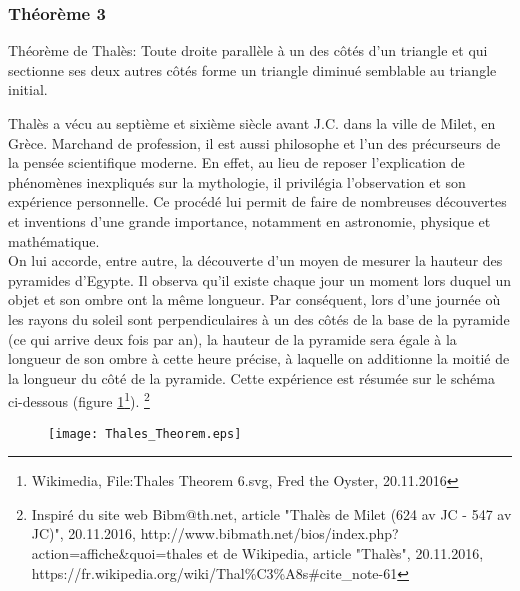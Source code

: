 \documentclass[a4paper,12pt]{article}
\begin{document}
\pagebreak
\subsubsection{Théorème 3}
\begin{theorem}
Théorème de Thalès: Toute droite parallèle à un des côtés d'un triangle et qui sectionne ses deux autres côtés forme un triangle diminué semblable au triangle initial.
\end{theorem}
\begin{remark}
Thalès a vécu au septième et sixième siècle avant J.C. dans la ville de Milet, en Grèce. Marchand de profession, il est aussi philosophe et l'un des précurseurs de la pensée scientifique moderne. En effet, au lieu de reposer l'explication de phénomènes inexpliqués sur la mythologie, il privilégia l'observation et son expérience personnelle. Ce procédé lui permit de faire de nombreuses découvertes et inventions d'une grande importance, notamment en astronomie, physique et mathématique.\\

On lui accorde, entre autre, la découverte d'un moyen de mesurer la hauteur des pyramides d'Egypte. Il observa qu'il existe chaque jour un moment lors duquel un objet et son ombre ont la même longueur. Par conséquent, lors d'une journée où les rayons du soleil sont perpendiculaires à un des côtés de la base de la pyramide (ce qui arrive deux fois par an), la hauteur de la pyramide sera égale à la longueur de son ombre à cette heure précise, à laquelle on additionne la moitié de la longueur du côté de la pyramide. Cette expérience est résumée sur le schéma ci-dessous (figure \ref{fig:thales}\footnote{Wikimedia, File:Thales Theorem 6.svg, Fred the Oyster, 20.11.2016}).
\footnote{Inspiré du site web Bibm@th.net, article "Thalès de Milet (624 av JC - 547 av JC)", 20.11.2016, http://www.bibmath.net/bios/index.php?action=affiche\&quoi=thales et de Wikipedia, article "Thalès", 20.11.2016, https://fr.wikipedia.org/wiki/Thal\%C3\%A8s\#cite\_note-61}


\begin{figure}[H]
    \centering
    \texttt{[image: Thales\_Theorem.eps]}
    
    \caption{}
    \label{fig:thales}
\end{figure}
\end{remark}
\end{document}

